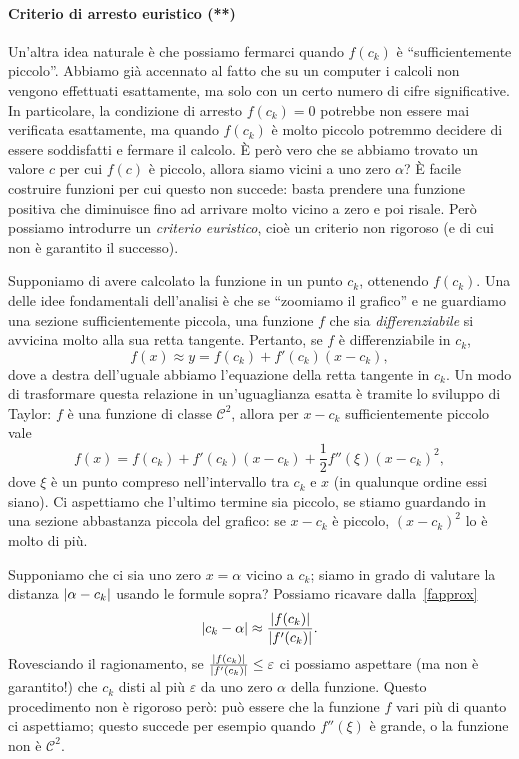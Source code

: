 \documentclass[a4paper]{report}
\DeclarePairedDelimiter{\abs}{\lvert}{\rvert}
\theoremstyle{definiton}
\theoremstyle{remark}
\begin{document}
\paragraph{Criterio di arresto euristico (**)} Un'altra idea naturale è che possiamo fermarci quando $f(c_k)$ è ``sufficientemente piccolo''. Abbiamo già accennato al fatto che su un computer i calcoli non vengono effettuati esattamente, ma solo con un certo numero di cifre significative. In particolare, la condizione di arresto $f(c_k) = 0$ potrebbe non essere mai verificata esattamente, ma quando $f(c_k)$ è molto piccolo potremmo decidere di essere soddisfatti e fermare il calcolo. È però vero che se abbiamo trovato un valore $c$ per cui $f(c)$ è piccolo, allora siamo vicini a uno zero $\alpha$? È facile costruire funzioni per cui questo non succede: basta prendere una funzione positiva che diminuisce fino ad arrivare molto vicino a zero e poi risale. Però possiamo introdurre un \emph{criterio euristico}, cioè un criterio non rigoroso (e di cui non è garantito il successo). 

Supponiamo di avere calcolato la funzione in un punto $c_k$, ottenendo $f(c_k)$. Una delle idee fondamentali dell'analisi è che se ``zoomiamo il grafico'' e ne guardiamo una sezione sufficientemente piccola, una funzione $f$ che sia \emph{differenziabile} si avvicina molto alla sua retta tangente. Pertanto, se $f$ è differenziabile in $c_k$,
\begin{equation} \label{fapprox}
    f(x) \approx y = f(c_k) + f'(c_k)(x-c_k),
\end{equation}
dove a destra dell'uguale abbiamo l'equazione della retta tangente in $c_k$. Un modo di trasformare questa relazione in un'uguaglianza esatta è tramite lo sviluppo di Taylor: $f$ è una funzione di classe $\mathcal{C}^2$, allora per $x-c_k$ sufficientemente piccolo vale
\[
    f(x) = f(c_k) + f'(c_k)(x-c_k) + \frac{1}{2}f''(\xi) (x-c_k)^2,
\]
dove $\xi$ è un punto compreso nell'intervallo tra $c_k$ e $x$ (in qualunque ordine essi siano). Ci aspettiamo che l'ultimo termine sia piccolo, se stiamo guardando in una sezione abbastanza piccola del grafico: se $x-c_k$ è piccolo, $(x-c_k)^2$ lo è molto di più.

Supponiamo che ci sia uno zero $x = \alpha$ vicino a $c_k$; siamo in grado di valutare la distanza $\abs{\alpha - c_k}$ usando le formule sopra? Possiamo ricavare dalla~\eqref{fapprox}
\[
\abs{c_k-\alpha} \approx \frac{\abs{f(c_k)}}{\abs{f'(c_k)}}.
\]
Rovesciando il ragionamento, se $\frac{\abs{f(c_k)}}{\abs{f'(c_k)}} \leq \varepsilon$ ci possiamo aspettare (ma non è garantito!) che $c_k$ disti al più $\varepsilon$ da uno zero $\alpha$ della funzione. Questo procedimento non è rigoroso però: può essere che la funzione $f$ vari più di quanto ci aspettiamo; questo succede per esempio quando $f''(\xi)$ è grande, o la funzione non è $\mathcal{C}^2$.
\end{document}
